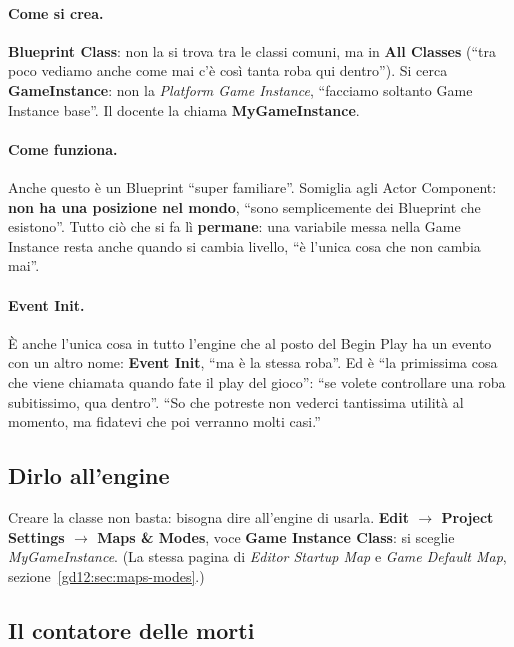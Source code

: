\paragraph{Come si crea.} \textbf{Blueprint Class}: non la si trova tra le
classi comuni, ma in \textbf{All Classes} (``tra poco vediamo anche come mai c'è
così tanta roba qui dentro''). Si cerca \textbf{GameInstance}: non la
\emph{Platform Game Instance}, ``facciamo soltanto Game Instance base''. Il
docente la chiama \textbf{MyGameInstance}.

\paragraph{Come funziona.} Anche questo è un Blueprint ``super familiare''.
Somiglia agli Actor Component: \textbf{non ha una posizione nel mondo}, ``sono
semplicemente dei Blueprint che esistono''. Tutto ciò che si fa lì
\textbf{permane}: una variabile messa nella Game Instance resta anche quando si
cambia livello, ``è l'unica cosa che non cambia mai''.

\paragraph{Event Init.} È anche l'unica cosa in tutto l'engine che al posto del
Begin Play ha un evento con un altro nome: \textbf{Event Init}, ``ma è la
stessa roba''. Ed è ``la primissima cosa che viene chiamata quando fate il play
del gioco'': ``se volete controllare una roba subitissimo, qua dentro''. ``So che
potreste non vederci tantissima utilità al momento, ma fidatevi che poi verranno
molti casi.''

\subsection{Dirlo all'engine}

Creare la classe non basta: bisogna dire all'engine di usarla. \textbf{Edit
$\rightarrow$ Project Settings $\rightarrow$ Maps \& Modes}, voce
\textbf{Game Instance Class}: si sceglie \emph{MyGameInstance}. (La stessa
pagina di \emph{Editor Startup Map} e \emph{Game Default Map},
sezione~\ref{gd12:sec:maps-modes}.)

\subsection{Il contatore delle morti}

